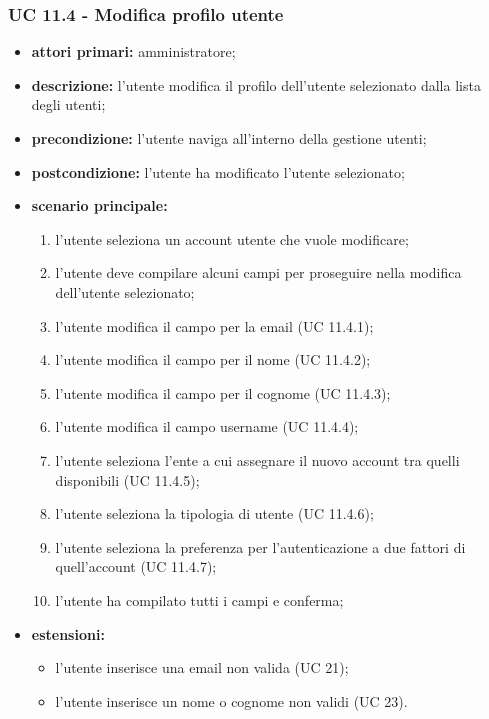 			\subsubsection{UC 11.4 - Modifica profilo utente}
			\begin{itemize}
				\item \textbf{attori primari:} amministratore;
				\item \textbf{descrizione:} l'utente modifica il profilo dell'utente selezionato dalla lista degli utenti;
				\item \textbf{precondizione:} l'utente naviga all'interno della gestione utenti;
				\item \textbf{postcondizione:} l'utente ha modificato l'utente selezionato;
				\item \textbf{scenario principale:}
				\begin{enumerate}
					\item l'utente seleziona un account utente che vuole modificare;
					\item l'utente deve compilare alcuni campi per proseguire nella modifica dell'utente selezionato;
					\item{l'utente modifica il campo per la email (UC 11.4.1);}
					\item{l'utente modifica il campo per il nome (UC 11.4.2);}
					\item{l'utente modifica il campo per il cognome (UC 11.4.3);}
					\item{l'utente modifica il campo username  (UC 11.4.4);}
					\item{l'utente seleziona l'ente a cui assegnare il nuovo account tra quelli disponibili (UC 11.4.5);}
					\item{l'utente seleziona la tipologia di utente (UC 11.4.6);}
					\item{l'utente seleziona la preferenza per l'autenticazione a due fattori di quell'account (UC 11.4.7);}
					\item{l'utente ha compilato tutti i campi e conferma;}
				\end{enumerate}
				\item \textbf{estensioni:}
				\begin{itemize}
					\item l'utente inserisce una email non valida (UC 21);
					\item l'utente inserisce un nome o cognome non validi (UC 23).
				\end{itemize}
			\end{itemize}

